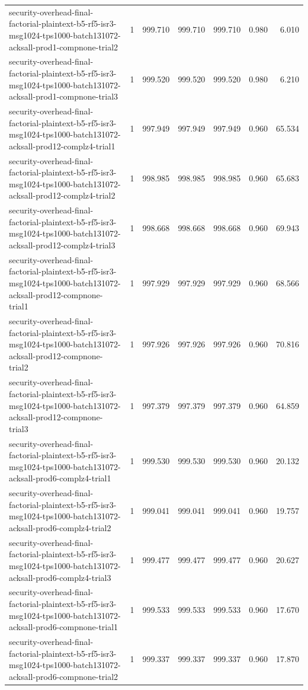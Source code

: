 \begin{tabular}{lrrrrrr}
security-overhead-final-factorial-plaintext-b5-rf5-isr3-msg1024-tps1000-batch131072-acksall-prod1-compnone-trial2 & 1 & 999.710 & 999.710 & 999.710 & 0.980 & 6.010 \\
security-overhead-final-factorial-plaintext-b5-rf5-isr3-msg1024-tps1000-batch131072-acksall-prod1-compnone-trial3 & 1 & 999.520 & 999.520 & 999.520 & 0.980 & 6.210 \\
security-overhead-final-factorial-plaintext-b5-rf5-isr3-msg1024-tps1000-batch131072-acksall-prod12-complz4-trial1 & 1 & 997.949 & 997.949 & 997.949 & 0.960 & 65.534 \\
security-overhead-final-factorial-plaintext-b5-rf5-isr3-msg1024-tps1000-batch131072-acksall-prod12-complz4-trial2 & 1 & 998.985 & 998.985 & 998.985 & 0.960 & 65.683 \\
security-overhead-final-factorial-plaintext-b5-rf5-isr3-msg1024-tps1000-batch131072-acksall-prod12-complz4-trial3 & 1 & 998.668 & 998.668 & 998.668 & 0.960 & 69.943 \\
security-overhead-final-factorial-plaintext-b5-rf5-isr3-msg1024-tps1000-batch131072-acksall-prod12-compnone-trial1 & 1 & 997.929 & 997.929 & 997.929 & 0.960 & 68.566 \\
security-overhead-final-factorial-plaintext-b5-rf5-isr3-msg1024-tps1000-batch131072-acksall-prod12-compnone-trial2 & 1 & 997.926 & 997.926 & 997.926 & 0.960 & 70.816 \\
security-overhead-final-factorial-plaintext-b5-rf5-isr3-msg1024-tps1000-batch131072-acksall-prod12-compnone-trial3 & 1 & 997.379 & 997.379 & 997.379 & 0.960 & 64.859 \\
security-overhead-final-factorial-plaintext-b5-rf5-isr3-msg1024-tps1000-batch131072-acksall-prod6-complz4-trial1 & 1 & 999.530 & 999.530 & 999.530 & 0.960 & 20.132 \\
security-overhead-final-factorial-plaintext-b5-rf5-isr3-msg1024-tps1000-batch131072-acksall-prod6-complz4-trial2 & 1 & 999.041 & 999.041 & 999.041 & 0.960 & 19.757 \\
security-overhead-final-factorial-plaintext-b5-rf5-isr3-msg1024-tps1000-batch131072-acksall-prod6-complz4-trial3 & 1 & 999.477 & 999.477 & 999.477 & 0.960 & 20.627 \\
security-overhead-final-factorial-plaintext-b5-rf5-isr3-msg1024-tps1000-batch131072-acksall-prod6-compnone-trial1 & 1 & 999.533 & 999.533 & 999.533 & 0.960 & 17.670 \\
security-overhead-final-factorial-plaintext-b5-rf5-isr3-msg1024-tps1000-batch131072-acksall-prod6-compnone-trial2 & 1 & 999.337 & 999.337 & 999.337 & 0.960 & 17.870 \\

\end{tabular}

